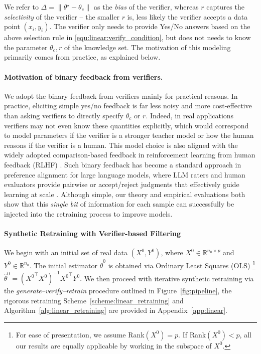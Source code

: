 We refer to $\Delta = \|\theta^\star - \theta_c\|$ as the \emph{bias} of the verifier, whereas  $r$ captures the \emph{selectivity} of the verifier --  the smaller $r$ is, less likely the verifier  accepts a data point $(x_i, y_i)$.  The verifier only needs to  provide Yes/No answers based on the above selection rule in   \eqref{equ:linear:verify_condition}, but does not  needs    to know the parameter  $\theta_c, r$ of the knowledge set.   The motivation of this modeling primarily comes from practice, as explained below. 

  
\paragraph{Motivation of binary feedback from verifiers.}    
We adopt the  binary feedback  from verifiers mainly for practical reasons.   
In practice, eliciting simple yes/no feedback is far less noisy and more cost-effective than asking verifiers to directly specify $\theta_c$ or $r$. Indeed, in real applications verifiers may not even know these quantities explicitly, which would correspond to model parameters if the verifier is a stronger teacher model or how the human reasons if the verifier is a human.  This model choice   is also aligned with the  widely adopted comparison-based feedback in reinforcement learning from human feedback (RLHF) \citep{ouyang2022training}. Such binary feedback has become a standard approach in preference alignment for large language models, where LLM raters and human evaluators provide pairwise or accept/reject judgments that effectively guide learning at scale \citep{wettigqurating}. Although simple, our theory and empirical evaluations both show that this \emph{single bit} of information for each sample can successfully be injected into the retraining process to improve models. 


\paragraph{Synthetic Retraining with Verifier-based Filtering}

We begin with an initial set of real data $(X^0, Y^0)$, where $X^0 \in \mathbb{R}^{n_0 \times p}$ and $Y^0 \in \mathbb{R}^{n_0}$.  
The initial estimator $\hat{\theta}^0$ is obtained via Ordinary Least Squares (OLS) \footnote{For ease of presentation, we assume Rank$(X^0)=p$. If Rank$(X^0)<p$, all our results are equally applicable by working in the subspace of $X^0$. }
$
\hat{\theta}^0 = ({X^{0}}^\top X^0)^{-1} {X^0}^\top Y^0. \label{equ:linear:theta0}
$
We then proceed with iterative synthetic retraining via the \emph{generate--verify--retrain} procedure outlined in Figure~\ref{fig:pipeline}, the rigorous retraining Scheme~\ref{scheme:linear_retraining} and Algorithm~\ref{alg:linear_retraining} are provided in Appendix~\ref{app:linear}.

